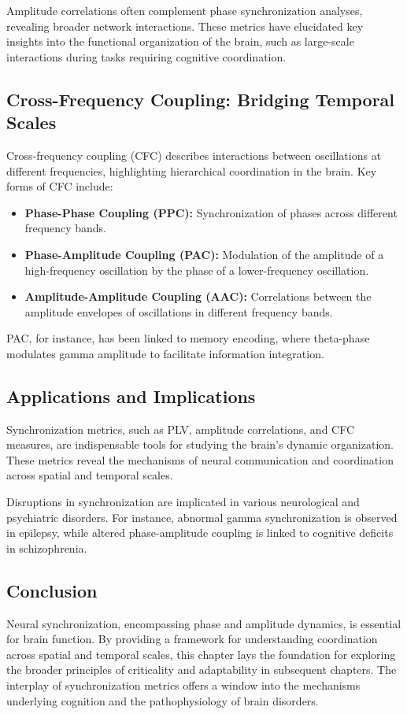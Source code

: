 Amplitude correlations often complement phase synchronization analyses, revealing broader network interactions. These metrics have elucidated key insights into the functional organization of the brain, such as large-scale interactions during tasks requiring cognitive coordination.

\subsection*{Cross-Frequency Coupling: Bridging Temporal Scales}

Cross-frequency coupling (CFC) describes interactions between oscillations at different frequencies, highlighting hierarchical coordination in the brain. Key forms of CFC include:
\begin{itemize}
    \item \textbf{Phase-Phase Coupling (PPC):} Synchronization of phases across different frequency bands.
    \item \textbf{Phase-Amplitude Coupling (PAC):} Modulation of the amplitude of a high-frequency oscillation by the phase of a lower-frequency oscillation.
    \item \textbf{Amplitude-Amplitude Coupling (AAC):} Correlations between the amplitude envelopes of oscillations in different frequency bands.
\end{itemize}
PAC, for instance, has been linked to memory encoding, where theta-phase modulates gamma amplitude to facilitate information integration.

\subsection*{Applications and Implications}

Synchronization metrics, such as PLV, amplitude correlations, and CFC measures, are indispensable tools for studying the brain’s dynamic organization. These metrics reveal the mechanisms of neural communication and coordination across spatial and temporal scales. 

Disruptions in synchronization are implicated in various neurological and psychiatric disorders. For instance, abnormal gamma synchronization is observed in epilepsy, while altered phase-amplitude coupling is linked to cognitive deficits in schizophrenia.

\subsection*{Conclusion}

Neural synchronization, encompassing phase and amplitude dynamics, is essential for brain function. By providing a framework for understanding coordination across spatial and temporal scales, this chapter lays the foundation for exploring the broader principles of criticality and adaptability in subsequent chapters. The interplay of synchronization metrics offers a window into the mechanisms underlying cognition and the pathophysiology of brain disorders.
